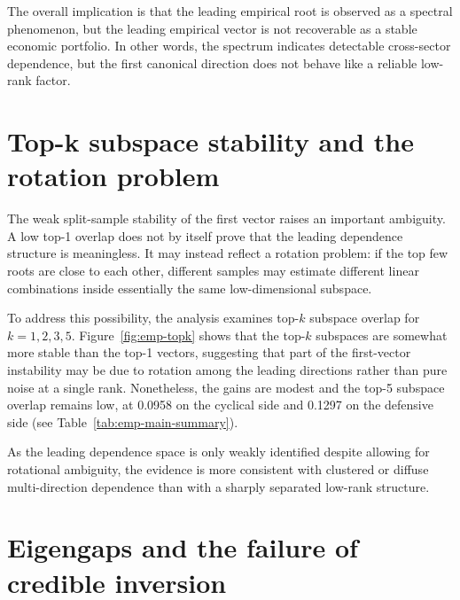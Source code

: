 \documentclass[12pt]{report} %
\begin{document}
The overall implication is that the leading empirical root is observed as a spectral phenomenon, but the 
leading empirical vector is not recoverable as a stable economic portfolio. In other words, the 
spectrum indicates detectable cross-sector dependence, but the first canonical direction does not 
behave like a reliable low-rank factor.

\section{Top-k subspace stability and the rotation problem}

The weak split-sample stability of the first vector raises an important ambiguity. A low top-1 overlap 
does not by itself prove that the leading dependence structure is meaningless. It may instead reflect a 
rotation problem: if the top few roots are close to each other, different samples may estimate different 
linear combinations inside essentially the same low-dimensional subspace.

To address this possibility, the analysis examines top-$k$ subspace overlap for $k=1,2,3,5$. 
Figure~\ref{fig:emp-topk} shows that the top-$k$ subspaces are somewhat more stable than the top-1 
vectors, suggesting that part of the first-vector instability may be due to rotation among the 
leading directions rather than pure noise at a single rank. Nonetheless, the gains are modest and 
the top-5 subspace overlap remains low, at 0.0958 on the cyclical side and 0.1297 on the defensive side 
(see Table~\ref{tab:emp-main-summary}). 

As the leading dependence space is only weakly identified despite allowing for rotational ambiguity, 
the evidence is more consistent with clustered or diffuse multi-direction 
dependence than with a sharply separated low-rank structure.


\section{Eigengaps and the failure of credible inversion}
\end{document}
